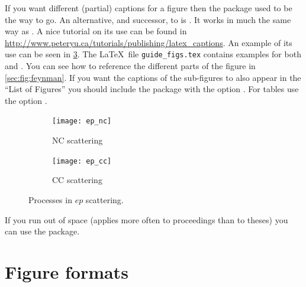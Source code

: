 If you want different (partial) captions for a figure then the
 package used to be the way to go. 
An alternative, and successor, to  is
. It works in much the same way as
. A nice tutorial on its use can be found in
\url{http://www.peteryu.ca/tutorials/publishing/latex_captions}.
An example of its use can be seen in \cref{fig:nccc}.
The \LaTeX\ file \texttt{guide\_figs.tex} contains examples for both  and 
.
You can see how to reference
the different parts of the figure in \cref{sec:fig:feynman}. If
you want the captions of the sub-figures to also appear in the
\enquote{List of Figures} you should include the package with the
option . For tables use the option .


\begin{figure}[htbp]
  \centering
  \begin{subfigure}[b]{0.5\figwidth}
    \texttt{[image: ep\_nc]}
    \caption{NC scattering}\label{fig:nccc-nc}
  \end{subfigure}
  \qquad
  \begin{subfigure}[b]{0.5\figwidth}
    \texttt{[image: ep\_cc]}
    \caption{CC scattering}\label{fig:nccc-cc}
  \end{subfigure}
  \caption{Processes in $ep$ scattering.}%
  \label{fig:nccc}
\end{figure}

If you run out of space (applies more often to proceedings than to
theses) you can use the  package.


\section{Figure formats}%
\label{sec:fig:formats}

